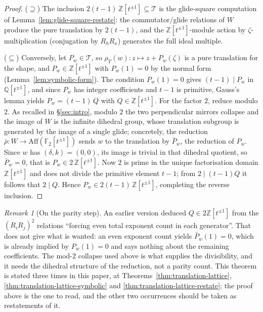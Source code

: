 \documentclass[11pt]{article}
\theoremstyle{plain}
\theoremstyle{definition}
\theoremstyle{remark}
\newtheorem{remark}[theorem]{Remark}
\begin{document}
\begin{proof}
($\supseteq$) The inclusion $2(t-1)\,\mathbb{Z}[t^{\pm 1}]
\subseteq \mathcal{T}$ is the glide-square computation of
Lemma~\ref{lem:glide-square-restate}: the commutator/glide relations of
$W$ produce the pure translation by $2(t-1)$, and the
$\mathbb{Z}[t^{\pm 1}]$-module action by $\zeta$-multiplication
(conjugation by $R_h R_x$) generates the full ideal multiple.

($\subseteq$) Conversely, let $P_w \in \mathcal{T}$, so
$\rho_T(w) : z \mapsto z + P_w(\zeta)$ is a pure translation for the
shape, and $P_w \in \mathbb{Z}[t^{\pm 1}]$ with $P_w(1) = 0$ by the
normal form (Lemma~\ref{lem:symbolic-form}). The condition $P_w(1) = 0$
gives $(t-1) \mid P_w$ in $\mathbb{Q}[t^{\pm 1}]$, and since $P_w$ has
integer coefficients and $t-1$ is primitive, Gauss's lemma yields
$P_w = (t-1)\,Q$ with $Q \in \mathbb{Z}[t^{\pm 1}]$. For the factor $2$, reduce modulo $2$. As recalled in
\S\ref{sec:intro}, modulo $2$ the two perpendicular mirrors collapse and the
image of $W$ is the infinite dihedral group, whose translation subgroup is
generated by the image of a single glide; concretely, the reduction
$\bar\rho : W \to \mathrm{Aff}(\mathbb{F}_2[t^{\pm1}])$ sends $w$ to the
translation by $\bar P_w$, the reduction of $P_w$. Since $w$ has
$(\delta,k) = (0,0)$, its image is trivial in that dihedral quotient, so
$\bar P_w = 0$, that is $P_w \in 2\,\mathbb{Z}[t^{\pm 1}]$. Now $2$ is prime in
the unique factorisation domain $\mathbb{Z}[t^{\pm 1}]$ and does not divide the
primitive element $t-1$; from $2 \mid (t-1)Q$ it follows that $2 \mid Q$. Hence
$P_w \in 2(t-1)\,\mathbb{Z}[t^{\pm 1}]$, completing the reverse inclusion.
\end{proof}

\begin{remark}[On the parity step]
\label{rem:parity-step}
An earlier version deduced $Q \in 2\mathbb{Z}[t^{\pm1}]$ from the
$(R_iR_j)^2$ relations ``forcing even total exponent count in each generator''.
That does not give what is wanted: an even exponent count yields
$\bar P_w(1) = 0$, which is already implied by $P_w(1) = 0$ and says nothing
about the remaining coefficients. The mod-$2$ collapse used above is what
supplies the divisibility, and it needs the dihedral structure of the reduction,
not a parity count. This theorem is stated three times in this paper, at
Theorems~\ref{thm:translation-lattice},
\ref{thm:translation-lattice-symbolic} and
\ref{thm:translation-lattice-restate}; the proof above is the one to read, and
the other two occurrences should be taken as restatements of it.
\end{remark}
\end{document}
